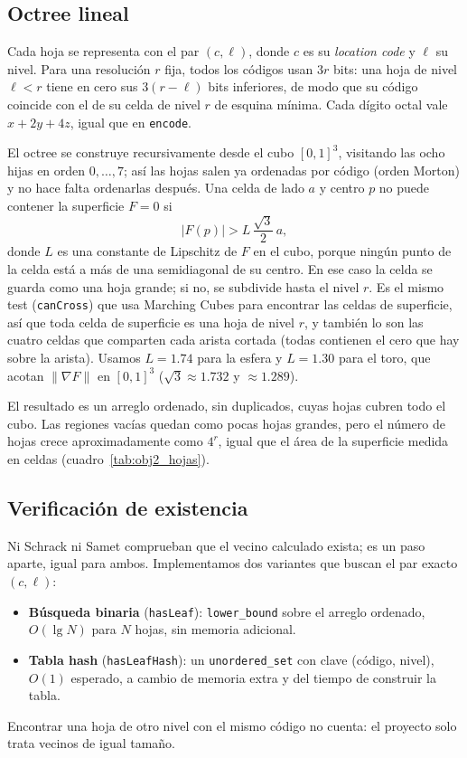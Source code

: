 \subsection{Octree lineal}

Cada hoja se representa con el par $(c,\ell)$, donde $c$ es su \emph{location code}
y $\ell$ su nivel. Para una resolución $r$ fija, todos los códigos usan $3r$ bits:
una hoja de nivel $\ell<r$ tiene en cero sus $3(r-\ell)$ bits inferiores, de modo que
su código coincide con el de su celda de nivel $r$ de esquina mínima. Cada dígito
octal vale $x+2y+4z$, igual que en \texttt{encode}.

El octree se construye recursivamente desde el cubo $[0,1]^3$, visitando las ocho
hijas en orden $0,\dots,7$; así las hojas salen ya ordenadas por código (orden
Morton) y no hace falta ordenarlas después. Una celda de lado $a$ y centro $p$ no
puede contener la superficie $F=0$ si
\[
    |F(p)| > L\,\frac{\sqrt{3}}{2}\,a,
\]
donde $L$ es una constante de Lipschitz de $F$ en el cubo, porque ningún punto de la
celda está a más de una semidiagonal de su centro. En ese caso la celda se guarda
como una hoja grande; si no, se subdivide hasta el nivel $r$. Es el mismo test
(\texttt{canCross}) que usa Marching Cubes para encontrar las celdas de superficie,
así que toda celda de superficie es una hoja de nivel $r$, y también lo son las
cuatro celdas que comparten cada arista cortada (todas contienen el cero que hay
sobre la arista). Usamos $L=1.74$ para la esfera y $L=1.30$ para el toro, que
acotan $\|\nabla F\|$ en $[0,1]^3$ ($\sqrt{3}\approx 1.732$ y $\approx 1.289$).

El resultado es un arreglo ordenado, sin duplicados, cuyas hojas cubren todo el
cubo. Las regiones vacías quedan como pocas hojas grandes, pero el número de hojas
crece aproximadamente como $4^r$, igual que el área de la superficie medida en
celdas (cuadro~\ref{tab:obj2_hojas}).

\subsection{Verificación de existencia}

Ni Schrack ni Samet comprueban que el vecino calculado exista; es un paso aparte,
igual para ambos. Implementamos dos variantes que buscan el par exacto
$(c,\ell)$:
\begin{itemize}
  \item \textbf{Búsqueda binaria} (\texttt{hasLeaf}): \texttt{lower\_bound} sobre el
        arreglo ordenado, $O(\lg N)$ para $N$ hojas, sin memoria adicional.
  \item \textbf{Tabla hash} (\texttt{hasLeafHash}): un \texttt{unordered\_set} con
        clave (código, nivel), $O(1)$ esperado, a cambio de memoria extra y del
        tiempo de construir la tabla.
\end{itemize}
Encontrar una hoja de otro nivel con el mismo código no cuenta: el proyecto solo
trata vecinos de igual tamaño.

